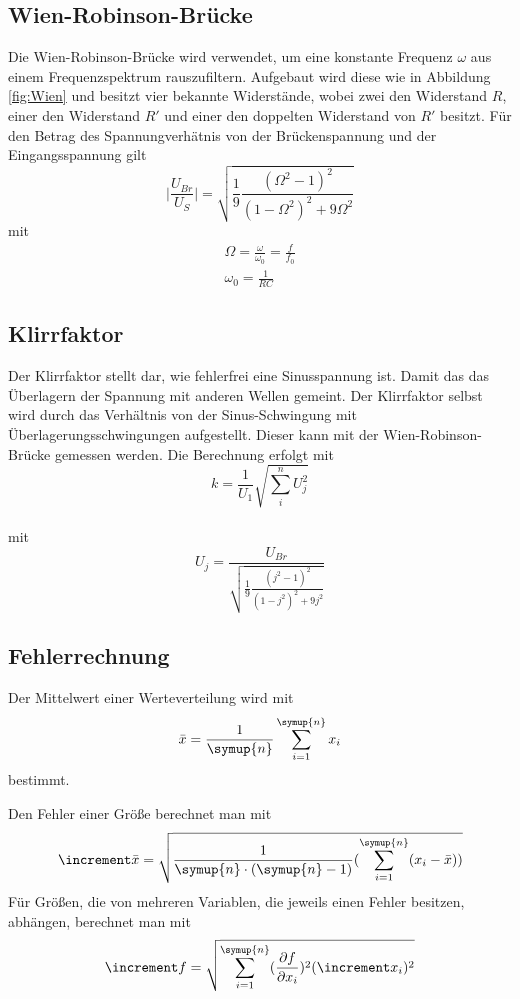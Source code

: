     \subsection{Wien-Robinson-Brücke}
    Die Wien-Robinson-Brücke wird verwendet, um eine konstante Frequenz $\omega$ aus einem Frequenzspektrum rauszufiltern.
    Aufgebaut wird diese wie in Abbildung \ref{fig:Wien} und besitzt vier bekannte Widerstände, wobei zwei den Widerstand $R$, einer den Widerstand $R'$ und einer den doppelten Widerstand von $R'$ besitzt.
    Für den Betrag des Spannungverhätnis von der Brückenspannung und der Eingangsspannung gilt 
    \begin{equation}
       \biggl|\frac{U_{Br}}{U_S}\biggr|=\sqrt{\frac{1}{9}\frac{(\Omega^2-1)^2}{(1-\Omega^2)^2+9\Omega^2}}
       \label{eqn:filter}
    \end{equation}
    mit 
    \begin{gather}
        \Omega=\frac{\omega}{\omega_0}=\frac{f}{f_0}
        \label{eqn:Omega}
        \\
        \omega_0=\frac{1}{RC}
        \label{eqn:omega}
    \end{gather}

    \subsection{Klirrfaktor}
    Der Klirrfaktor stellt dar, wie fehlerfrei eine Sinusspannung ist. 
    Damit das das Überlagern der Spannung mit anderen Wellen gemeint.
    Der Klirrfaktor selbst wird durch das Verhältnis von der Sinus-Schwingung mit Überlagerungsschwingungen aufgestellt.
    Dieser kann mit der Wien-Robinson-Brücke gemessen werden.       
    Die Berechnung erfolgt mit 
    \begin{equation}
        k=\frac{1}{U_1}\sqrt{\sum_{i}^{n}{U_j^2}}
    \end{equation}\\
    mit
    \begin{equation}
        U_j=\frac{U_{Br}}{\sqrt{\frac{1}{9} \frac{(j^2-1)^2}{(1-j^2)^2+9j^2}}} 
    \end{equation}

\subsection{Fehlerrechnung}
Der Mittelwert einer Werteverteilung wird mit
\begin{equation}
    \bar{x}=\frac{1}{\symup{n}}\sum_{i=1}^{\symup{n}} x_i
    \label{eqn:MW}
\end{equation} 
bestimmt.

Den Fehler einer Größe berechnet man mit
\begin{equation}
    \increment\bar{x}=\sqrt{\frac{1}{\symup{n}\cdot(\symup{n}-1)}(\sum_{i=1}^{\symup{n}} (x_i - \bar{x}))}
    \label{eqn:fehler}
\end{equation}
Für Größen, die von mehreren Variablen, die jeweils einen Fehler besitzen, abhängen, berechnet man mit
\begin{equation}
    \increment f=\sqrt{\sum_{i=1}^{\symup{n}} (\frac{\partial f}{\partial x_i})^2 (\increment x_i)^2}
    \label{eqn:fehlerfortpflanzung}
\end{equation}

